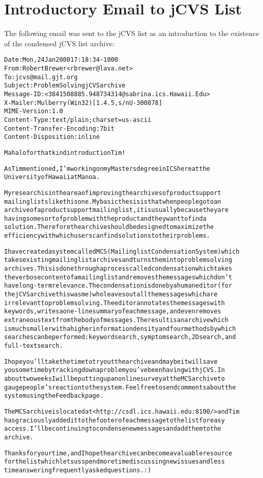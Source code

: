 \chapter{Introductory Email to jCVS List}
\label{cha:intro-email}
The following email was sent to the jCVS list as an introduction to the
existence of the condensed jCVS list archive:

\begin{alltt}
{\footnotesize{}Date: Mon, 24 Jan 2000 17:18:34 -1000
From: Robert Brewer <rbrewer@lava.net>
To: jcvs@mail.gjt.org
Subject: Problem Solving jCVS archive
Message-ID: <3841508885.948734314@sabrina.ics.Hawaii.Edu>
X-Mailer: Mulberry (Win32) [1.4.5, s/n U-300878]
MIME-Version: 1.0
Content-Type: text/plain; charset=us-ascii
Content-Transfer-Encoding: 7bit
Content-Disposition: inline

Mahalo for that kind introduction Tim!

As Tim mentioned, I'm working on my Masters degree in ICS here at the
University of Hawaii at Manoa.

My research is in the area of improving the archives of product support
mailing lists like this one. My basic thesis is that when people go to an
archive of a product support mailing list, it is usually because they are
having some sort of problem with the product and they want to find a
solution. Therefore the archive should be designed to maximize the
efficiency with which users can find solutions to their problems.

I have created a system called MCS (Mailinglist Condensation System) which
takes existing mailing list archives and turns them into problem solving
archives. This is done through a process called condensation which takes
the verbose content of a mailing list and removes the messages which don't
have long-term relevance. The condensation is done by a human editor (for
the jCVS archive this was me) who leaves out all the messages which are
irrelevant to problem solving. The editor annotates the messages with
keywords, writes a one-line summary of each message, and even removes
extraneous text from the body of messages. The result is an archive which
is much smaller with a higher information density and four methods by which
searches can be performed: keyword search, symptom search, 2D search, and
full-text search.

I hope you'll take the time to try out the archive and maybe it will save
you some time by tracking down a problem you've been having with jCVS. In
about two weeks I will be putting up an online survey at the MCS archive to
gauge people's reaction to the system. Feel free to send comments about the
system using the Feedback page.

The MCS archive is located at <http://csdl.ics.hawaii.edu:8100/> and Tim
has graciously added it to the footer of each message to the list for easy
access. I'll be continuing to condense new messages and add them to the
archive.

Thanks for your time, and I hope the archive can become a valuable resource
for the list which lets us spend more time discussing new issues and less
time answering frequently asked questions. :)}
\end{alltt}


